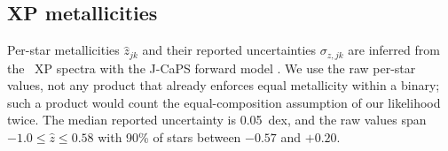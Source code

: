 \subsection{XP metallicities}

Per-star metallicities $\widehat z_{jk}$ and their reported uncertainties
$\sigma_{z,jk}$ are inferred from the \gaia\ XP spectra with the J-CaPS
forward model \citep{Li2026JCaPS}.  We use the raw per-star values, not any
product that already enforces equal metallicity within a binary; such a
product would count the equal-composition assumption of our likelihood twice.
The median reported uncertainty is 0.05~dex, and the raw values span
$-1.0\le\widehat z\le0.58$ with 90\% of stars between $-0.57$ and $+0.20$.
